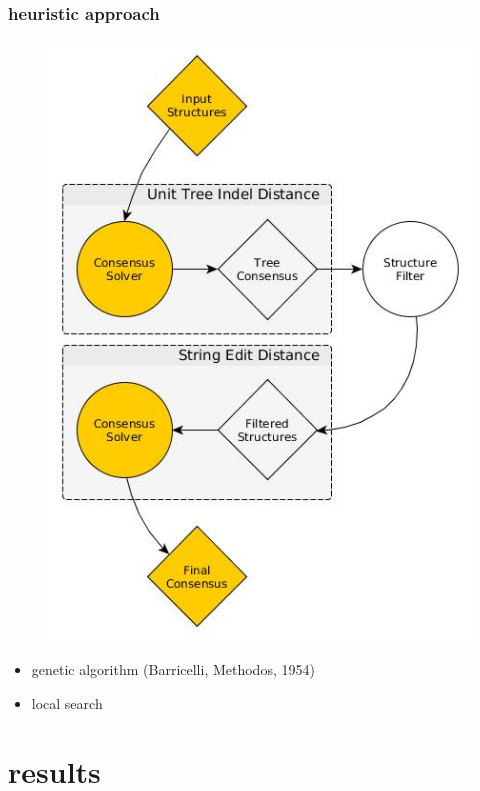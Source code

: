 \documentclass{beamer}
\begin{document}
\begin{frame}
	\frametitle{heuristic approach}
		\begin{figure}
	\includegraphics[scale=0.23]{figs/workflow}
	\end{figure}
	\begin{itemize}
		\item genetic algorithm (Barricelli, Methodos, 1954)
		\item local search
	\end{itemize}
	
\end{frame}


\section{results}
\end{document}
